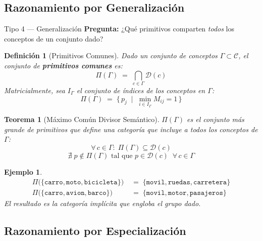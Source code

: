 \documentclass[12pt]{article}
\newtheorem{theorem}{Teorema}[section]
\newtheorem{definition}{Definición}[section]
\newtheorem{example}{Ejemplo}[section]
\begin{document}
\subsection{Razonamiento por Generalización}

\begin{razonbox}{Tipo 4 — Generalización}
	\textbf{Pregunta:} ¿Qué primitivos comparten \emph{todos} los conceptos de un
	conjunto dado?
\end{razonbox}

\begin{definition}[Primitivos Comunes]
	Dado un conjunto de conceptos $\Gamma \subset \mathcal{C}$, el conjunto de
	\textbf{primitivos comunes} es:
	\[
	\Pi(\Gamma) \;=\; \bigcap_{c \in \Gamma} \mathcal{D}(c)
	\]
	Matricialmente, sea $I_\Gamma$ el conjunto de índices de los conceptos en
	$\Gamma$:
	\[
	\Pi(\Gamma) \;=\; \bigl\{\,p_j
	\;\mid\; \min_{i \in I_\Gamma} M_{ij} = 1\,\bigr\}
	\]
\end{definition}

\begin{theorem}[Máximo Común Divisor Semántico]
	$\Pi(\Gamma)$ es el conjunto más grande de primitivos que define una
	categoría que incluye a todos los conceptos de $\Gamma$:
	\[
	\forall\, c \in \Gamma:\; \Pi(\Gamma) \subseteq \mathcal{D}(c)
	\]
	\[
	\nexists\; p \notin \Pi(\Gamma) \text{ tal que }
	p \in \mathcal{D}(c)\;\;\forall\,c \in \Gamma
	\]
\end{theorem}

\begin{example}
	\begin{align*}
		\Pi\!\bigl(\{\texttt{carro},\texttt{moto},\texttt{bicicleta}\}\bigr)
		&\;=\; \{\texttt{movil},\texttt{ruedas},\texttt{carretera}\} \\[4pt]
		\Pi\!\bigl(\{\texttt{carro},\texttt{avion},\texttt{barco}\}\bigr)
		&\;=\; \{\texttt{movil},\texttt{motor},\texttt{pasajeros}\}
	\end{align*}
	El resultado es la categoría implícita que engloba el grupo dado.
\end{example}

\subsection{Razonamiento por Especialización}
\end{document}
